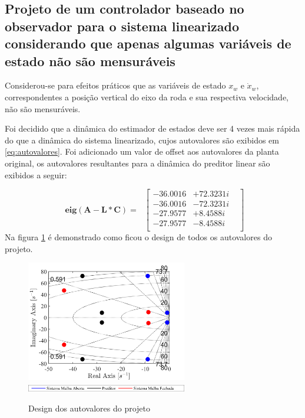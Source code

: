 \documentclass[a4paper]{ifacconf}
\begin{document}
    
        \subsection{Projeto de um controlador baseado no observador para o sistema linearizado considerando
        que apenas algumas variáveis de estado não são mensuráveis}

    Considerou-se para efeitos práticos que as variáveis de estado $x_w$ e $\dot{x}_w$, correspondentes a posição vertical do eixo da roda e sua respectiva velocidade, não são mensuráveis.

    Foi decidido que a dinâmica do estimador de estados deve ser 4 vezes  mais rápida do que a dinâmica do sistema linearizado, cujos autovalores são exibidos em \ref{eq:autovalores}. Foi adicionado um valor de offset aos autovalores da planta original, os autovalores resultantes para a dinâmica do preditor linear são exibidos a seguir:

    \begin{equation} \label{eq:autovalores_pred}
        \begin{split}
              \mathbf{eig(A-L*C)}=\
        \end{split}
        \begin{bmatrix}
             -36.0016& +72.3231i&\\
             -36.0016& -72.3231i&\\
             -27.9577& +8.4588i&\\
             -27.9577& -8.4588i&\\
        \end{bmatrix}
    \end{equation}
    Na figura \ref{fig:autovalores_projeto} é demonstrado como ficou o design de todos os autovalores do projeto.
    \FloatBarrier
    \begin{figure}[htbp]
        \begin{centering}
            \includegraphics[width=7cm]{img/autovalores_projeto.png}
            \includegraphics[width=7cm]{img/autovalores_projeto_leg.png}
            \caption{Design dos autovalores do projeto}
            \label{fig:autovalores_projeto}
        \end{centering}
    \end{figure}
    \FloatBarrier
\end{document}
